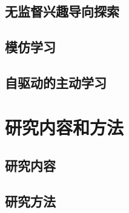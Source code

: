         \subsection{无监督兴趣导向探索}



        \subsection{模仿学习}

        \subsection{自驱动的主动学习}

    \section{研究内容和方法}

        \subsection{研究内容}

        \subsection{研究方法}

